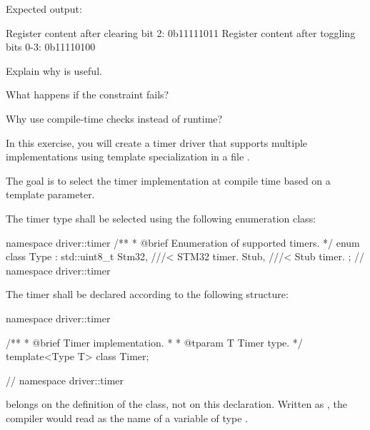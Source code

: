 \noindent Expected output:

\begin{console}
Register content after clearing bit 2: 0b11111011
Register content after toggling bits 0-3: 0b11110100
\end{console}

\label{c5:set:2}

\label{c5:ex:2.1}
\begin{parts}
  \item Explain why  is useful.
  \item What happens if the constraint fails?
  \item Why use compile-time checks instead of runtime?
\end{parts}

\label{c5:set:3}

\label{c5:ex:3.1}
In this exercise, you will create a timer driver that supports multiple implementations using
template specialization in a file .

The goal is to select the timer implementation at compile time based on a template parameter.

The timer type shall be selected using the following enumeration class:

\begin{cppcode}
namespace driver::timer
{
/**
 * @brief Enumeration of supported timers.
 */
enum class Type : std::uint8_t
{
    Stm32, ///< STM32 timer.
    Stub,  ///< Stub timer.
};
} // namespace driver::timer
\end{cppcode}

\noindent The timer shall be declared according to the following structure:

\begin{cppcode}
namespace driver::timer
{
/**
 * @brief Timer implementation.
 *
 * @tparam T Timer type.
 */
template<Type T>
class Timer;

} // namespace driver::timer
\end{cppcode}

\note {} belongs on the definition of the class, not on this declaration. Written as
, the compiler would read  as the name of a variable of type
.

